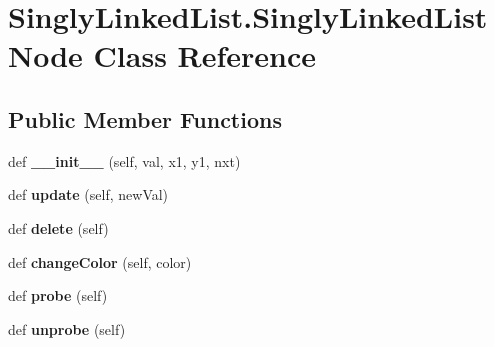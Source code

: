 \hypertarget{class_singly_linked_list_1_1_singly_linked_list_node}{}\section{Singly\+Linked\+List.\+Singly\+Linked\+List\+Node Class Reference}
\label{class_singly_linked_list_1_1_singly_linked_list_node}
\subsection*{Public Member Functions}
\begin{DoxyCompactItemize}
\item 
def {\bfseries \+\_\+\+\_\+init\+\_\+\+\_\+} (self, val, x1, y1, nxt)\hypertarget{class_singly_linked_list_1_1_singly_linked_list_node_a7dc5e943f0780eb94e10a3e127e9981e}{}\label{class_singly_linked_list_1_1_singly_linked_list_node_a7dc5e943f0780eb94e10a3e127e9981e}

\item 
def {\bfseries update} (self, new\+Val)\hypertarget{class_singly_linked_list_1_1_singly_linked_list_node_aa68f8ef3332faaa7d105f0ee6a26537f}{}\label{class_singly_linked_list_1_1_singly_linked_list_node_aa68f8ef3332faaa7d105f0ee6a26537f}

\item 
def {\bfseries delete} (self)\hypertarget{class_singly_linked_list_1_1_singly_linked_list_node_a0acea59e6b0d5b52205ebdedcba44d31}{}\label{class_singly_linked_list_1_1_singly_linked_list_node_a0acea59e6b0d5b52205ebdedcba44d31}

\item 
def {\bfseries change\+Color} (self, color)\hypertarget{class_singly_linked_list_1_1_singly_linked_list_node_a0b8e7f821c47733bed23ba4acca433ce}{}\label{class_singly_linked_list_1_1_singly_linked_list_node_a0b8e7f821c47733bed23ba4acca433ce}

\item 
def {\bfseries probe} (self)\hypertarget{class_singly_linked_list_1_1_singly_linked_list_node_acef058b54a5cc6cce223cdad32d0e546}{}\label{class_singly_linked_list_1_1_singly_linked_list_node_acef058b54a5cc6cce223cdad32d0e546}

\item 
def {\bfseries unprobe} (self)\hypertarget{class_singly_linked_list_1_1_singly_linked_list_node_a8c96a79dc1f27ca37ab82dcd80bcac51}{}\label{class_singly_linked_list_1_1_singly_linked_list_node_a8c96a79dc1f27ca37ab82dcd80bcac51}


\end{DoxyCompactItemize}
